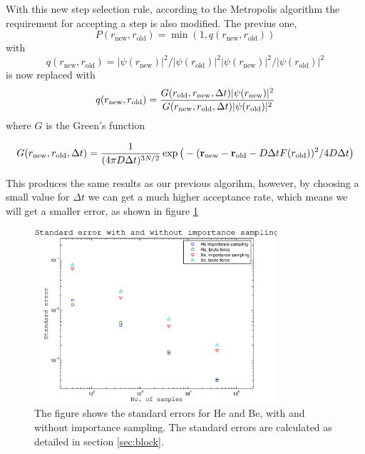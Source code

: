 \documentclass[aps,prc,twocolumn,floatfix]{revtex4}
\def\rvec{\textbf{r}}
\begin{document}
With this new step selection rule, according to the Metropolis algorithm the requirement for accepting a step is also modified. The previus one, 
\begin{equation}
P(r_\text{new}, r_\text{old}) = \min(1,q(r_\text{new}, r_\text{old}))
\end{equation}
with 
\begin{equation}
 q(r_\text{new}, r_\text{old}) = |\psi(r_\text{new})|^2/ |\psi(r_\text{old})|^2 |\psi(r_\text{new})|^2/ |\psi(r_\text{old})|^2
\end{equation}
is now replaced with 
\begin{equation}
 q(r_\text{new}, r_\text{old}) = {G(r_\text{old}, r_\text{new},\Delta t)|\psi(r_\text{new})|^2 \over G(r_\text{new},r_\text{old}, \Delta t) |\psi(r_\text{old})|^2 }
\end{equation}
where $G$ is the Green's function
\begin{widetext}
 \begin{equation}
  G(r_\text{new},r_\text{old}, \Delta t) = {1 \over (4\pi D \Delta t)^{3N/2}}\exp\big(-(\rvec_\text{new} - \rvec_\text{old} - D\Delta t F(r_\text{old}))^2/4D\Delta t\big)
 \end{equation}
 \end{widetext}

 This produces the same results as our previous algorihm, however, by choosing a small value for $\Delta t$ we can get a much higher acceptance rate, which means we will get a smaller error, as shown in figure \ref{fig:1}
 
  \begin{figure}
\centering
\includegraphics[width=9cm]{figures/errors.eps}
\caption{\label{fig:1} The figure shows the standard errors for He and Be, with and without importance sampling. The standard errors are calculated as detailed in section \ref{sec:block}.}
\end{figure}
 
\end{document}
